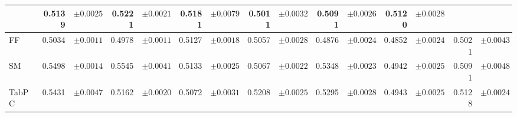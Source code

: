 \begin{table}[htbp]
{\begin{tabular}{
l
r@{}l
r@{}l
r@{}l
r@{}l
r@{}l
r@{}l
r@{}l
}
 & 0.5139 & \footnotesize{$\pm 0.0025$}
 & 0.5221 & \footnotesize{$\pm 0.0021$}
 & 0.5181 & \footnotesize{$\pm 0.0079$}
 & 0.5011 & \footnotesize{$\pm 0.0032$}
 & 0.5091 & \footnotesize{$\pm 0.0026$}
 & 0.5120 & \footnotesize{$\pm 0.0028$}
 \\
    \midrule
    FF & 0.5034 & \footnotesize{$\pm 0.0011$}
 & 0.4978 & \footnotesize{$\pm 0.0011$}
 & 0.5127 & \footnotesize{$\pm 0.0018$}
 & 0.5057 & \footnotesize{$\pm 0.0028$}
 & 0.4876 & \footnotesize{$\pm 0.0024$}
 & 0.4852 & \footnotesize{$\pm 0.0024$}
 & 0.5021 & \footnotesize{$\pm 0.0043$}
 \\
    SM & 0.5498 & \footnotesize{$\pm 0.0014$}
 & 0.5545 & \footnotesize{$\pm 0.0041$}
 & 0.5133 & \footnotesize{$\pm 0.0025$}
 & 0.5067 & \footnotesize{$\pm 0.0022$}
 & 0.5348 & \footnotesize{$\pm 0.0023$}
 & 0.4942 & \footnotesize{$\pm 0.0025$}
 & 0.5091 & \footnotesize{$\pm 0.0048$}
 \\
    TabPC & 0.5431 & \footnotesize{$\pm 0.0047$}
 & 0.5162 & \footnotesize{$\pm 0.0020$}
 & 0.5072 & \footnotesize{$\pm 0.0031$}
 & 0.5208 & \footnotesize{$\pm 0.0025$}
 & 0.5295 & \footnotesize{$\pm 0.0028$}
 & 0.4943 & \footnotesize{$\pm 0.0025$}
 & 0.5128 & \footnotesize{$\pm 0.0024$}
 \\
    \bottomrule[1.0pt]
\end{tabular}}
\end{table}
